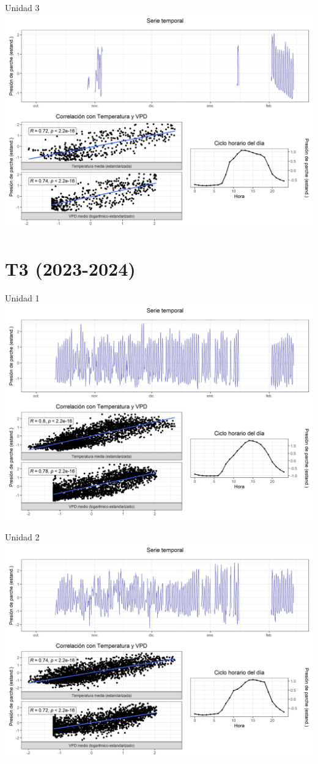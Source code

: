 \documentclass[
  letterpaper,
  DIV=11,
  numbers=noendperiod]{scrreprt}
\begin{document}
Unidad 3
\includegraphics{figuras/04_turgor_unidad/2023_2024_La_Esperanza_T2_Unidad_3.png}

\chapter{T3 (2023-2024)}

Unidad 1
\includegraphics{figuras/04_turgor_unidad/2023_2024_La_Esperanza_T3_Unidad_1.png}

Unidad 2
\includegraphics{figuras/04_turgor_unidad/2023_2024_La_Esperanza_T3_Unidad_2.png}
\end{document}
